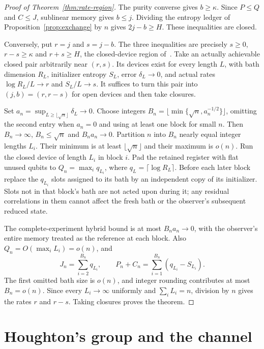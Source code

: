 \documentclass[11pt,a4paper]{article}
\theoremstyle{plain}
\theoremstyle{definition}
\theoremstyle{remark}
\begin{document}
\begin{proof}[Proof of Theorem~\ref{thm:rate-region}]
The purity converse gives $b\ge\kappa$. Since $P\le Q$ and $C\le J$, sublinear memory gives $b\le j$. Dividing the entropy ledger of
Proposition~\ref{prop:exchange} by $n$ gives $2j-b\ge H$. These inequalities are closed.

Conversely, put $r=j$ and $s=j-b$. The three inequalities are precisely $s\ge0$, $r-s\ge\kappa$ and $r+s\ge H$, the closed-device region
of~\cite[Theorem~2.1]{Douglas2026closed}. Take an actually achievable closed pair arbitrarily near $(r,s)$. Its devices exist for every length
$L$, with bath dimension $R_L$, initializer entropy $S_L$, error $\delta_L\to0$, and actual rates $\log R_L/L\to r$ and $S_L/L\to s$.
It suffices to turn this pair into $(j,b)=(r,r-s)$ for open devices and then take closures.

Set $a_n=\sup_{L\ge\lfloor\sqrt n\rfloor}\delta_L\to0$. Choose integers
$B_n=\lfloor\min\{\sqrt n,a_n^{-1/2}\}\rfloor$, omitting the second entry when $a_n=0$ and using at least one block for small $n$.
Then $B_n\to\infty$, $B_n\le\sqrt n$ and $B_na_n\to0$. Partition $n$ into $B_n$ nearly equal integer lengths $L_i$. Their minimum is at least
$\lfloor\sqrt n\rfloor$ and their maximum is $o(n)$. Run the closed device of length $L_i$ in block $i$. Pad the retained register with flat
unused qubits to $Q_n=\max_i q_{L_i}$, where $q_L=\lceil\log R_L\rceil$. Before each later block replace the $q_{L_i}$ slots assigned to its bath
by an independent copy of its initializer. Slots not in that block's bath are not acted upon during it; any residual correlations in them
cannot affect the fresh bath or the observer's subsequent reduced state.

The complete-experiment hybrid bound is at most $B_na_n\to0$, with the observer's entire memory treated as the reference at each block.
Also $Q_n=O(\max_i L_i)=o(n)$, and
\[
J_n=\sum_{i=2}^{B_n}q_{L_i},\qquad P_n+C_n=\sum_{i=1}^{B_n}(q_{L_i}-S_{L_i}).
\]
The first omitted bath size is $o(n)$, and integer rounding contributes at most $B_n=o(n)$. Since every $L_i\to\infty$ uniformly and
$\sum_iL_i=n$, division by $n$ gives the rates $r$ and $r-s$. Taking closures proves the theorem.
\end{proof}


\section{Houghton's group and the channel}\label{sec:houghton}
\end{document}
